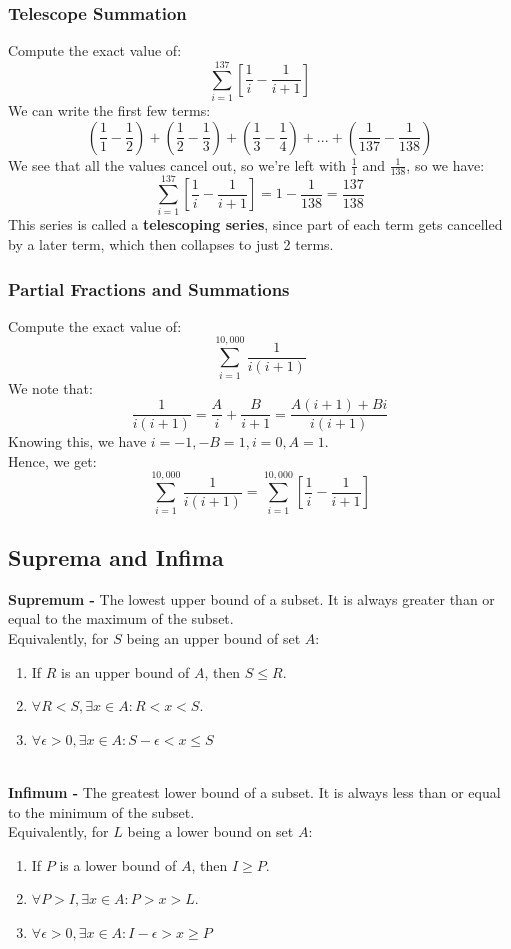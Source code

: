 \documentclass{article}
\begin{document}
\subsubsection{Telescope Summation}
Compute the exact value of:
$$\sum_{i=1}^{137} \left[ \frac{1}{i} - \frac{1}{i + 1}\right]$$
We can write the first few terms:
$$(\frac{1}{1} - \frac{1}{2}) + (\frac{1}{2} - \frac{1}{3}) + (\frac{1}{3} - \frac{1}{4}) + ... + (\frac{1}{137} - \frac{1}{138})$$
We see that all the values cancel out, so we're left with $\frac{1}{1}$ and $\frac{1}{138}$, so we have:
$$\sum_{i=1}^{137} \left[ \frac{1}{i} - \frac{1}{i + 1}\right] = 1 - \frac{1}{138} = \frac{137}{138}$$
This series is called a \textbf{telescoping series}, since part of each term gets cancelled by a later term, which then collapses to just 2 terms.

\subsubsection{Partial Fractions and Summations}
Compute the exact value of:
$$\sum_{i=1}^{10,000} \frac{1}{i(i+1)}$$
We note that:
$$\frac{1}{i(i+1)} = \frac{A}{i} + \frac{B}{i+1} = \frac{A(i+1) + Bi}{i(i+1)}$$
Knowing this, we have $i = -1, -B = 1, i = 0, A = 1$.\\
Hence, we get:
$$\sum_{i=1}^{10,000} \frac{1}{i(i+1)} = \sum_{i=1}^{10,000} \left[ \frac{1}{i} - \frac{1}{i + 1}\right]$$

\subsection{Suprema and Infima}
\textbf{Supremum -} The lowest upper bound of a subset. It is always greater than or equal to the maximum of the subset.\\
Equivalently, for $S$ being an upper bound of set $A$:
\begin{enumerate}
    \item If $R$ is an upper bound of $A$, then $S \leq R$.
    \item $\forall R < S, \exists x \in A : R < x < S$.
    \item $\forall \epsilon > 0, \exists x \in A : S - \epsilon < x \leq S$
\end{enumerate}\\
\textbf{Infimum -} The greatest lower bound of a subset. It is always less than or equal to the minimum of the subset.\\
Equivalently, for $L$ being a lower bound on set $A$:
\begin{enumerate}
    \item If $P$ is a lower bound of $A$, then $I \geq P$.
    \item $\forall P > I, \exists x \in A : P > x > L$.
    \item $\forall \epsilon > 0, \exists x \in A : I - \epsilon > x \geq P$
\end{enumerate}
\end{document}
